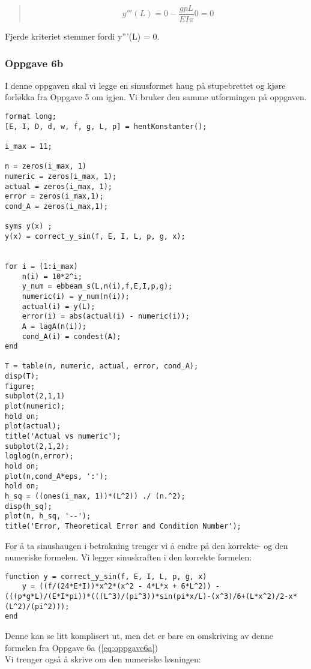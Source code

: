 \begin{quote}
\begin{equation*}
y'''(L) = 0 - \frac{gpL}{EI\pi} 0 = 0
\end{equation*}
\end{quote}
Fjerde kriteriet stemmer fordi y'''(L) = 0.

\subsubsection{Oppgave 6b}
I denne oppgaven skal vi legge en sinusformet haug på stupebrettet og kjøre forløkka fra Oppgave 5 om igjen. Vi bruker den samme utformingen på oppgaven.

\begin{lstlisting}
format long;
[E, I, D, d, w, f, g, L, p] = hentKonstanter();

i_max = 11;

n = zeros(i_max, 1)
numeric = zeros(i_max, 1);
actual = zeros(i_max, 1);
error = zeros(i_max,1);
cond_A = zeros(i_max,1);

syms y(x) ;
y(x) = correct_y_sin(f, E, I, L, p, g, x);


for i = (1:i_max)
    n(i) = 10*2^i;
    y_num = ebbeam_s(L,n(i),f,E,I,p,g);
    numeric(i) = y_num(n(i));
    actual(i) = y(L);
    error(i) = abs(actual(i) - numeric(i));
    A = lagA(n(i));
    cond_A(i) = condest(A);
end

T = table(n, numeric, actual, error, cond_A);
disp(T);
figure;
subplot(2,1,1)
plot(numeric);
hold on;
plot(actual);
title('Actual vs numeric');
subplot(2,1,2);
loglog(n,error);
hold on;
plot(n,cond_A*eps, ':');
hold on;
h_sq = ((ones(i_max, 1))*(L^2)) ./ (n.^2);
disp(h_sq);
plot(n, h_sq, '--');
title('Error, Theoretical Error and Condition Number');
\end{lstlisting}
For å ta sinushaugen i betrakning trenger vi å endre på den korrekte- og den numeriske formelen. Vi legger sinuskraften i den korrekte formelen:
\\
\begin{lstlisting}
function y = correct_y_sin(f, E, I, L, p, g, x)
    y = ((f/(24*E*I))*x^2*(x^2 - 4*L*x + 6*L^2)) - (((p*g*L)/(E*I*pi))*(((L^3)/(pi^3))*sin(pi*x/L)-(x^3)/6+(L*x^2)/2-x*(L^2)/(pi^2)));
end
\end{lstlisting}

Denne kan se litt komplisert ut, men det er bare en omskriving av denne formelen fra Oppgave 6a (\ref{eq:oppgave6a})
\\Vi trenger også å skrive om den numeriske løsningen:

